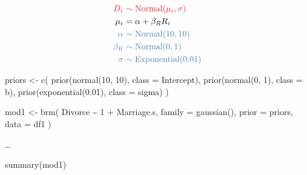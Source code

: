 \documentclass[
  a4paper,11pt,twoside,onecolumn,openright,final,oldfontcommands]{memoir}
\newenvironment{Shaded}{\begin{snugshade}}{\end{snugshade}}
\newcommand{\AttributeTok}[1]{\textcolor[rgb]{0.77,0.63,0.00}{#1}}
\newcommand{\DecValTok}[1]{\textcolor[rgb]{0.00,0.00,0.81}{#1}}
\newcommand{\FloatTok}[1]{\textcolor[rgb]{0.00,0.00,0.81}{#1}}
\newcommand{\FunctionTok}[1]{\textcolor[rgb]{0.00,0.00,0.00}{#1}}
\newcommand{\NormalTok}[1]{#1}
\newcommand{\OtherTok}[1]{\textcolor[rgb]{0.56,0.35,0.01}{#1}}
\newcommand{\SpecialCharTok}[1]{\textcolor[rgb]{0.00,0.00,0.00}{#1}}
\theoremstyle{definition}
\theoremstyle{definition}
\theoremstyle{definition}
\theoremstyle{remark}
\begin{document}
\[
\begin{aligned}
\color{orangered}{D_{i}} \ &\color{orangered}{\sim \mathrm{Normal}(\mu_{i}, \sigma)} \\
\color{black}{\mu_{i}} \ &\color{black}{= \alpha + \beta_{R} R_{i}} \\
\color{steelblue}{\alpha} \ &\color{steelblue}{\sim \mathrm{Normal}(10, 10)} \\
\color{steelblue}{\beta_{R}} \ &\color{steelblue}{\sim \mathrm{Normal}(0, 1)} \\
\color{steelblue}{\sigma} \ &\color{steelblue}{\sim \mathrm{Exponential}(0.01)} \\
\end{aligned}
\]

\begin{Shaded}
\begin{Highlighting}[]
\NormalTok{priors }\OtherTok{\textless{}{-}} \FunctionTok{c}\NormalTok{(}
  \FunctionTok{prior}\NormalTok{(}\FunctionTok{normal}\NormalTok{(}\DecValTok{10}\NormalTok{, }\DecValTok{10}\NormalTok{), }\AttributeTok{class =}\NormalTok{ Intercept),}
  \FunctionTok{prior}\NormalTok{(}\FunctionTok{normal}\NormalTok{(}\DecValTok{0}\NormalTok{, }\DecValTok{1}\NormalTok{), }\AttributeTok{class =}\NormalTok{ b),}
  \FunctionTok{prior}\NormalTok{(}\FunctionTok{exponential}\NormalTok{(}\FloatTok{0.01}\NormalTok{), }\AttributeTok{class =}\NormalTok{ sigma)}
\NormalTok{  )}

\NormalTok{mod1 }\OtherTok{\textless{}{-}} \FunctionTok{brm}\NormalTok{(}
\NormalTok{  Divorce }\SpecialCharTok{\textasciitilde{}} \DecValTok{1} \SpecialCharTok{+}\NormalTok{ Marriage.s,}
  \AttributeTok{family =} \FunctionTok{gaussian}\NormalTok{(),}
  \AttributeTok{prior =}\NormalTok{ priors,}
  \AttributeTok{data =}\NormalTok{ df1}
\NormalTok{  )}
\end{Highlighting}
\end{Shaded}

\ldots{}

\begin{Shaded}
\begin{Highlighting}[]
\FunctionTok{summary}\NormalTok{(mod1)}
\end{Highlighting}
\end{Shaded}
\end{document}
